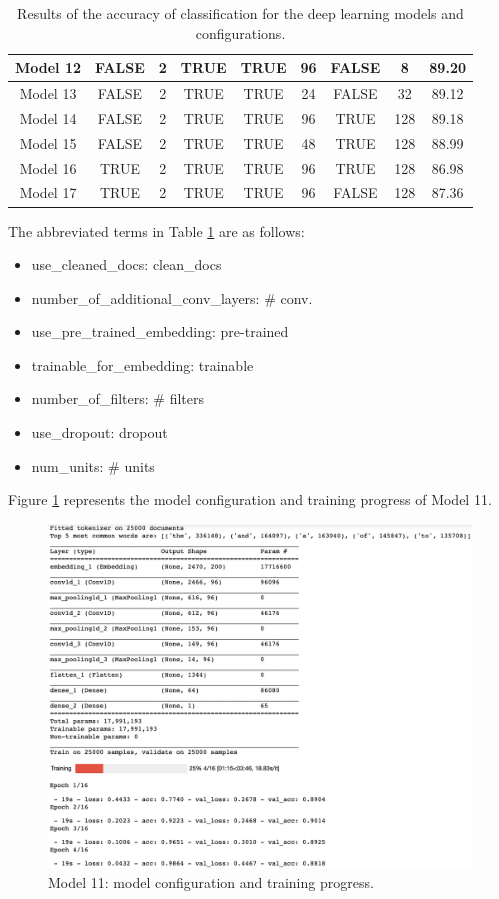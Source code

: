 \documentclass[11pt]{article}
\begin{document}
\begin{table}[h!]
\begin{tabular}{||c|c|c|c|c|c|c|c|c||}
\hline
Model	12	&	FALSE	&	2	&	TRUE	&	TRUE	&	96	&	FALSE	&	8	&	89.20	\\
\hline
Model	13	&	FALSE	&	2	&	TRUE	&	TRUE	&	24	&	FALSE	&	32	&	89.12	\\
\hline
Model	14	&	FALSE	&	2	&	TRUE	&	TRUE	&	96	&	TRUE	&	128	&	89.18	\\
\hline
Model	15	&	FALSE	&	2	&	TRUE	&	TRUE	&	48	&	TRUE	&	128	&	88.99	\\
\hline
Model	16	&	TRUE	&	2	&	TRUE	&	TRUE	&	96	&	TRUE	&	128	&	86.98	\\
\hline
Model	17	&	TRUE	&	2	&	TRUE	&	TRUE	&	96	&	FALSE	&	128	&	87.36	\\
\hline
\end{tabular}
\caption{Results of the accuracy of classification for the deep learning models and configurations.}
\label{table:acc_classification}
\end{table}

\noindent The abbreviated terms in Table \ref{table:acc_classification} are as follows:
\begin{itemize}
\setlength\itemsep{-1em}
\item use\_cleaned\_docs: clean\_docs
\item number\_of\_additional\_conv\_layers: \# conv.
\item use\_pre\_trained\_embedding: pre-trained
\item trainable\_for\_embedding: trainable
\item number\_of\_filters: \# filters
\item use\_dropout: dropout
\item num\_units: \# units
\end{itemize}


Figure \ref{fig:model11config} represents the model configuration and training progress of Model 11.
\begin{figure}[h!]
\centering 
\includegraphics[width=\textwidth]{model11_config.png}
\caption{Model 11: model configuration and training progress.}
  \label{fig:model11config}
\end{figure}
\end{document}
